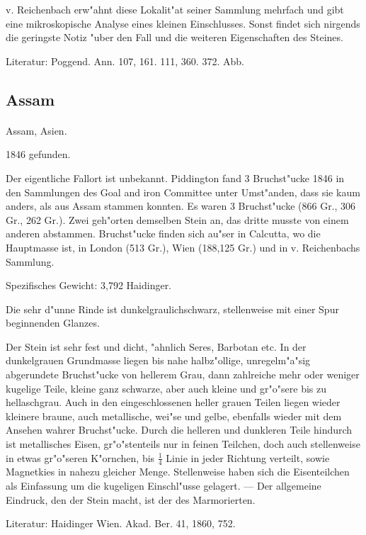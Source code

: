 \documentclass[a4paper, 11pt, oneside]{article}
\begin{document}
v. Reichenbach erw"ahnt diese Lokalit"at seiner Sammlung mehrfach und gibt eine mikroskopische Analyse eines kleinen Einschlusses. Sonst findet sich nirgends die geringste Notiz "uber den Fall und die weiteren Eigenschaften des Steines.

Literatur: Poggend. Ann. 107, 161. 111, 360. 372. Abb.

\subsection{Assam}
\normalsize
\paragraph{}
Assam, Asien.

1846 gefunden.

Der eigentliche Fallort ist unbekannt. Piddington fand 3 Bruchst"ucke 1846 in den Sammlungen des Goal and iron Committee unter Umst"anden, dass sie kaum anders, als aus Assam stammen konnten. Es waren 3 Bruchst"ucke (866 Gr., 306 Gr., 262 Gr.). Zwei geh"orten demselben Stein an, das dritte musste von einem anderen abstammen. Bruchst"ucke finden sich au"ser in Calcutta, wo die Hauptmasse ist, in London (513 Gr.), Wien (188,125 Gr.) und in v. Reichenbachs Sammlung.

Spezifisches Gewicht: 3,792 Haidinger.

Die sehr d"unne Rinde ist dunkelgraulichschwarz, stellenweise mit einer Spur beginnenden Glanzes.

Der Stein ist sehr fest und dicht, "ahnlich Seres, Barbotan etc. In der dunkelgrauen Grundmasse liegen bis nahe halbz"ollige, unregelm"a"sig abgerundete Bruchst"ucke von hellerem Grau, dann zahlreiche mehr oder weniger kugelige Teile, kleine ganz schwarze, aber auch kleine und gr"o"sere bis zu hellaschgrau. Auch in den eingeschlossenen heller grauen Teilen liegen wieder kleinere braune, auch metallische, wei"se und gelbe, ebenfalls wieder mit dem Ansehen wahrer Bruchst"ucke. Durch die helleren und dunkleren Teile hindurch ist metallisches Eisen, gr"o"stenteils nur in feinen Teilchen, doch auch stellenweise in etwas gr"o"seren K"ornchen, bis $\frac{1}{4}$ Linie in jeder Richtung verteilt, sowie Magnetkies in nahezu gleicher Menge. Stellenweise haben sich die Eisenteilchen als Einfassung um die kugeligen Einschl"usse gelagert. --- Der allgemeine Eindruck, den der Stein macht, ist der des Marmorierten.

Literatur: Haidinger Wien. Akad. Ber. 41, 1860, 752.
\end{document}
